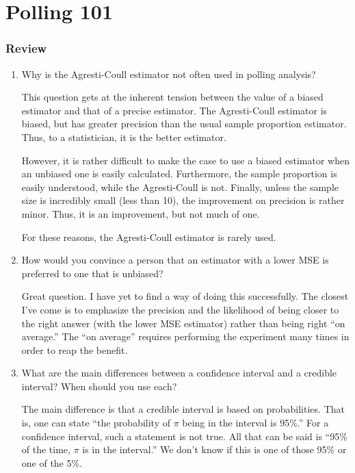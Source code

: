 \chapter{Polling 101}\label{ch:polling101}

\subsection*{Review}
\begin{enumerate}

  \item Why is the Agresti-Coull estimator not often used in polling analysis?
\begin{solution}
This question gets at the inherent tension between the value of a biased estimator and that of a precise estimator. The Agresti-Coull estimator is biased, but has greater precision than the usual sample proportion estimator. Thus, to a statistician, it is the better estimator.

However, it is rather difficult to make the case to use a biased estimator when an unbiased one is easily calculated. Furthermore, the sample proportion is easily understood, while the Agresti-Coull is not. Finally, unless the sample size is incredibly small (less than 10), the improvement on precision is rather minor. Thus, it is an improvement, but not much of one.

For these reasons, the Agresti-Coull estimator is rarely used.
\end{solution}
%


  \item How would you convince a person that an estimator with a lower MSE is preferred to one that is unbiased?
\begin{solution}
Great question. I have yet to find a way of doing this successfully. The closest I've come is to emphasize the precision and the likelihood of being closer to the right answer (with the lower MSE estimator) rather than being right ``on average.'' The ``on average'' requires performing the experiment many times in order to reap the benefit.
\end{solution}
%


  \item What are the main differences between a confidence interval and a credible interval? When should you use each?
\begin{solution}
The main difference is that a credible interval is based on probabilities. That is, one can state ``the probability of $\pi$ being in the interval is 95\%.'' For a confidence interval, such a statement is not true. All that can be said is ``95\% of the time, $\pi$ is in the interval.'' We don't know if this is one of those 95\% or one of the 5\%.


\end{solution}
\end{enumerate}

